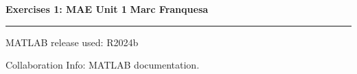 \documentclass[a4paper,12pt]{report}
\begin{document}
{\Large{\textbf{Exercises 1: MAE Unit 1}} \hfill \textbf{Marc Franquesa}}
\hrule
\vspace{0.5cm}

MATLAB release used: R2024b

Collaboration Info: MATLAB documentation.

\bigskip

\begin{exlist}
    
\end{exlist}
\end{document}
